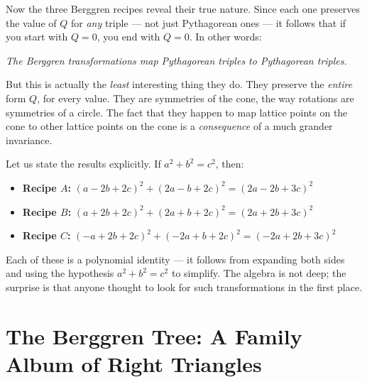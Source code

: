 \documentclass[11pt,openright,twoside]{book}
\renewenvironment{quotation}{%
  \par\vspace{8pt}%
  \begin{list}{}{%
    \setlength{\leftmargin}{2em}%
    \setlength{\rightmargin}{2em}%
  }\item[]\itshape\color{pullquote}%
}{%
  \end{list}%
  \par\vspace{8pt}%
}
\theoremstyle{definition}
\begin{document}
Now the three Berggren recipes reveal their true nature. Since each one preserves the value of $Q$ for \textit{any} triple --- not just Pythagorean ones --- it follows that if you start with $Q = 0$, you end with $Q = 0$. In other words:

\begin{quotation}
\noindent\itshape \textit{The Berggren transformations map Pythagorean triples to Pythagorean triples.}
\end{quotation}

But this is actually the \textit{least} interesting thing they do. They preserve the \textit{entire} form $Q$, for every value. They are symmetries of the cone, the way rotations are symmetries of a circle. The fact that they happen to map lattice points on the cone to other lattice points on the cone is a \textit{consequence} of a much grander invariance.

Let us state the results explicitly. If $a^2 + b^2 = c^2$, then:

\begin{itemize}[leftmargin=*]
\item \textbf{Recipe $A$:} $(a - 2b + 2c)^2 + (2a - b + 2c)^2 = (2a - 2b + 3c)^2$
\end{itemize}

\begin{itemize}[leftmargin=*]
\item \textbf{Recipe $B$:} $(a + 2b + 2c)^2 + (2a + b + 2c)^2 = (2a + 2b + 3c)^2$
\end{itemize}

\begin{itemize}[leftmargin=*]
\item \textbf{Recipe $C$:} $(-a + 2b + 2c)^2 + (-2a + b + 2c)^2 = (-2a + 2b + 3c)^2$
\end{itemize}

Each of these is a polynomial identity --- it follows from expanding both sides and using the hypothesis $a^2 + b^2 = c^2$ to simplify. The algebra is not deep; the surprise is that anyone thought to look for such transformations in the first place.


\bigskip


\section{The Berggren Tree: A Family Album of Right Triangles}
\end{document}
